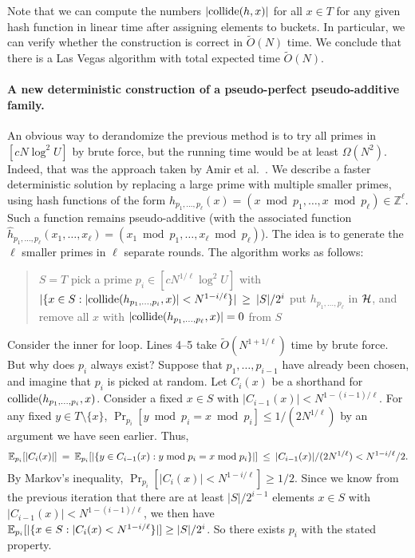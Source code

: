 \documentclass[11pt]{article}
\newcommand{\Z}{\mathbb{Z}}
\newcommand{\OO}{\widetilde{O}}
\begin{document}
{Note that we can compute the numbers
$|\textrm{collide}(h,x)|$ for all $x\in T$ for any given hash function
in linear time after assigning elements to buckets.
In particular, we can verify whether the
construction is correct in $\OO(N)$ time.
We conclude that there is a Las Vegas algorithm with total expected time  $\OO(N)$.

\paragraph{A new deterministic construction of a pseudo-perfect pseudo-additive family.}
An obvious way to derandomize the previous method is to try
all primes in $[cN\log^2 U]$ by brute force, but the running time
would be at least
$\Omega(N^2)$.  Indeed, that was the approach taken by
Amir et al.~\cite{AKP07}.  We describe a faster deterministic
solution by replacing a large prime with multiple smaller
primes, using hash functions of the form
$h_{p_1,\ldots,p_\ell}(x)=(x\bmod{p_1},\ldots, x\bmod{p_\ell}) \in\Z^\ell$.  Such a function remains pseudo-additive
(with the associated function $\hat{h}_{p_1,\ldots,p_\ell}(x_1,\ldots,x_\ell)
= (x_1\bmod{p_1},\ldots, x_\ell\bmod{p_\ell})$).
The idea is to generate the $\ell$ smaller primes in $\ell$
separate rounds.  The algorithm works as follows:

\begin{quote}
\begin{algorithmic}[1]

 \State  $S=T$
     \State pick a prime $p_i\in [cN^{1/\ell}\log^2 U]$ with
     \State \ \ \ \
$|\{x\in S: |\textrm{collide}(h_{p_1,\ldots,p_i},x)| < N^{1-i/\ell}\}|
\:\ge\: |S|/2^i$
   \EndFor
   \State put $h_{p_1,\ldots,p_\ell}$ in ${\cal H}$, and
remove all $x$ with $|\textrm{collide}(h_{p_1,\ldots,p_\ell},x)|=0$ from $S$
 \EndWhile
 \end{algorithmic}
\end{quote}

Consider the inner for loop.  Lines 4--5 take $\OO(N^{1+1/\ell})$
time by brute force.  But why does $p_i$ always exist?
Suppose that $p_1,\ldots,p_{i-1}$ have already been chosen, and imagine that $p_i$ is picked at random.
Let $C_i(x)$ be a shorthand for $\textrm{collide}(h_{p_1,\ldots,p_i},x)$.
Consider a fixed $x\in S$ with $|C_{i-1}(x)| < N^{1-(i-1)/\ell}$.
For any fixed $y\in T\setminus\{x\}$, $\Pr_{p_i}[y\bmod{p_i}=x\bmod{p_i}]\le 1/(2N^{1/\ell})$ by
an argument we have seen earlier.
Thus, $$\mathbb{E}_{p_i}[|C_i(x)|] \:=\: \mathbb{E}_{p_i}[|\{y\in C_{i-1}(x): y\bmod{p_i}=x\bmod{p_i}\}|]
\:\le\: |C_{i-1}(x)|/(2N^{1/\ell}) < N^{1-i/\ell}/2.$$
By Markov's inequality,
$\Pr_{p_i}[|C_i(x)| < N^{1-i/\ell}] \ge 1/2$.
Since we know from the previous iteration that there
are at least $|S|/2^{i-1}$ elements $x\in S$
with $|C_{i-1}(x)| < N^{1-(i-1)/\ell}$, we then have
$\mathbb{E}_{p_i}[|\{x\in S: |C_i(x)< N^{1-i/\ell}\}|]\ge |S|/2^i$.
So there exists $p_i$ with the stated property.

}
\end{document}
